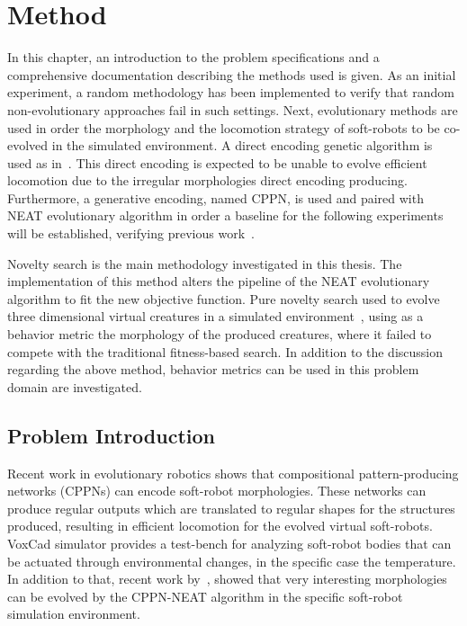 
\chapter{Method} %

\label{Method} %



In this chapter, an introduction to the problem specifications and a comprehensive documentation describing the methods used is given. As an initial experiment, a random methodology has been implemented to verify that random non-evolutionary approaches fail in such settings. Next, evolutionary methods are used in order the morphology and the locomotion strategy of soft-robots to be co-evolved in the simulated environment. A direct encoding genetic algorithm is used as in~\citep{cheney2013unshackling}. This direct encoding is expected to be unable to evolve efficient locomotion due to the irregular morphologies direct encoding producing. Furthermore, a generative encoding, named CPPN, is used and paired with NEAT evolutionary algorithm in order a baseline for the following experiments will be established, verifying previous work~\citep{cheney2013unshackling}.

Novelty search is the main methodology investigated in this thesis. The implementation of this method alters the pipeline of the NEAT evolutionary algorithm to fit the new objective function. Pure novelty search used to evolve three dimensional virtual creatures in a simulated environment~\citep{lehman2011evolving}, using as a behavior metric the morphology of the produced creatures, where it failed to compete with the traditional fitness-based search. In addition to the discussion regarding the above method, behavior metrics can be used in this problem domain are investigated. 



\section{Problem Introduction}

Recent work in evolutionary robotics shows that compositional pattern-producing networks (CPPNs) can encode soft-robot morphologies. These networks can produce regular outputs which are translated to regular shapes for the structures produced, resulting in efficient locomotion for the evolved virtual soft-robots. VoxCad simulator provides a test-bench for analyzing soft-robot bodies that can be actuated through environmental changes, in the specific case the temperature. In addition to that, recent work by~\citep{cheney2013unshackling}, showed that very interesting morphologies can be evolved by the CPPN-NEAT algorithm in the specific soft-robot simulation environment.

